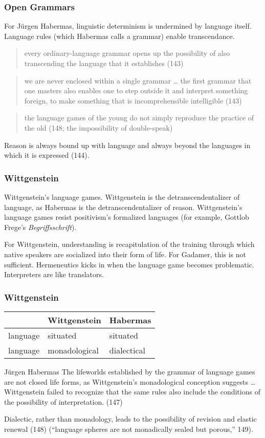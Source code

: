\documentclass[xcolor=dvipsnames]{beamer}
\begin{document}
\begin{frame}
  \frametitle{Open Grammars}
  For J{\"u}rgen Habermas, linguistic determinism is undermined by
  language itself. Language rules (which Habermas calls a grammar)
  enable transcendance.
  \begin{quote}
    every ordinary-language grammar opens up the possibility of also
    transcending the language that it establishes (143)
  \end{quote}
  \begin{quote}
    we are never enclosed within a single grammar {\ldots} the first
    grammar that one masters also enables one to step outside it and
    interpret something foreign, to make something that is
    incomprehensible intelligible (143)
  \end{quote}
  \begin{quote}
    the language games of the young do not simply reproduce the
    practice of the old (148; the impossibility of double-speak)
  \end{quote}
  Reason is always bound up with language and always beyond the
  languages in which it is expressed (144).
\end{frame}

\begin{frame}
  \frametitle{Wittgenstein}
  Wittgenstein's \alert{language games}. Wittgenstein is the
  detranscendentalizer of language, as Habermas is the
  detranscendentalizer of reason. Wittgenstein's language games resist
  positivism's formalized languages (for example, Gottlob Frege's
  \emph{Begriffsschrift}).

\bigskip

  For Wittgenstein, understanding is recapitulation of the training
  through which native speakers are socialized into their form of
  life. For Gadamer, this is not sufficient. Hermeneutics kicks in
  when the language game becomes problematic. Interpreters are like
  translators.
\end{frame}

\begin{frame}
  \frametitle{Wittgenstein}
  \begin{tabular}{|l|l|l|}\hline
    & Wittgenstein & Habermas \\ \hline
    language & situated & situated \\ \hline
    language & monadological & dialectical \\ \hline
  \end{tabular}
  \begin{block}{J{\"u}rgen Habermas}
    The lifeworlds established by the grammar of language games are
    not closed life forms, as Wittgenstein's monadological conception
    suggests {\ldots} Wittgenstein failed to recognize that the same
    rules also include the conditions of the possibility of
    interpretation. (147)
  \end{block}
  Dialectic, rather than monadology, leads to the possibility of
  revision and elastic renewal (148) (``language spheres are not
  monadically sealed but porous,'' 149).
\end{frame}
\end{document}
